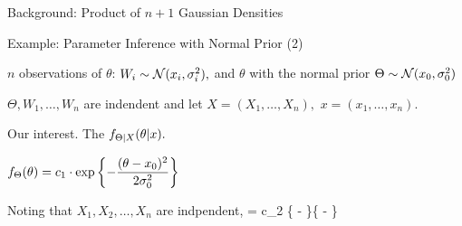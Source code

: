 \begin{frame}{Background: Product of $n+1$ Gaussian Densities}


\end{frame}

\begin{frame}{Example: Parameter Inference with Normal Prior (2)}

    \plitemsep 0.03in
    \bci
    
  \item $n$ observations of $\theta$: $W_i \sim
    \mathcal N(x_i,\sigma_i^2),$ and $\theta$ with the normal prior $\Theta \sim \mathcal N(x_0,\sigma_0^2)$

  \item $\Theta, W_1, \ldots, W_n$ are indendent and
    let  $X = (X_1, \ldots, X_n),$ $x=(x_1, \ldots, x_n).$      

  \item Our interest. The  $f_{\Theta|X}(\theta|x).$ 


    \medskip
  \item<2->  $\displaystyle f_\Theta(\theta) = c_1\cdot \exp\left\{ -
        \frac{(\theta - x_0)^2}{2 \sigma_0^2}  \right\}$
\item<3->  Noting that $X_1, X_2, \ldots, X_n$
  are indpendent, 
  \aleq
  {
    \fxcth = c_2 \cdot \exp \left\{ -
         \right\}\cdots \exp \left\{ -
        \right\}
    }
\eci



\end{frame}

